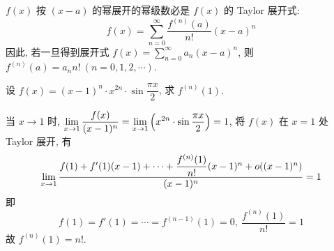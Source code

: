 \begin{theorem}
    $f(x)$ 按 $(x-a)$ 的幂展开的幂级数必是 $f(x)$ 的 Taylor 展开式:
    $$f(x) =\sum ^{\infty }_{n=0}\dfrac{f^{(n) }(a) }{n!}(x-a) ^{n}$$
    因此, 若一旦得到展开式 $\displaystyle f(x)=\sum_{n=0}^{\infty}a_n(x-a)^n$, 则 $f^{(n)}(a)=a_nn!~  (n=0,1,2,\cdots).$
\end{theorem}

\begin{example}
    设 $f(x)=(x-1)^n\cdot x^{2n}\cdot\sin\dfrac{\pi x}{2}$, 求 $f^{(n)}(1).$
\end{example}
\begin{solution}
    当 $x\to1$ 时, $\displaystyle\lim_{x\to1}\dfrac{f(x)}{(x-1)^n}=\lim_{x\to1}\qty(x^{2n}\cdot\sin\dfrac{\pi x}{2})=1$, 将 $f(x)$ 在 $x=1$ 处 Taylor 展开, 有
    $$\lim_{x\to1}\dfrac{f(1)+f'(1)(x-1)+\cdots+\dfrac{f^{(n)}(1)}{n!}(x-1)^n+o\qty((x-1)^{n})}{(x-1)^n}=1$$
    即 $$f(1)=f'(1)=\cdots=f^{(n-1)}(1)=0,~\dfrac{f^{(n)}(1)}{n!}=1$$
    故 $f^{(n)}(1)=n!.$
\end{solution}

